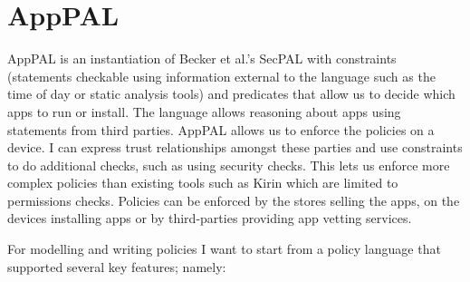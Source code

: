 \documentclass[thesis.tex]{subfiles}
\begin{document}
\chapter{AppPAL}

AppPAL is an instantiation of Becker et al.'s SecPAL\cite{becker_secpal:_2010}
with constraints (statements checkable using information external to the
language such as the time of day or static analysis tools) and predicates that
allow us to decide which apps to run or install. The language allows reasoning
about apps using statements from third parties. AppPAL allows us to enforce the
policies on a device. I can express trust relationships amongst these parties
and use constraints to do additional checks, such as using security checks. This
lets us enforce more complex policies than existing tools such as Kirin which
are limited to permissions checks. Policies can be enforced by the stores
selling the apps, on the devices installing apps or by third-parties providing
app vetting services.

For modelling and writing policies I want to start from a policy
language that supported several key features; namely:
\end{document}
